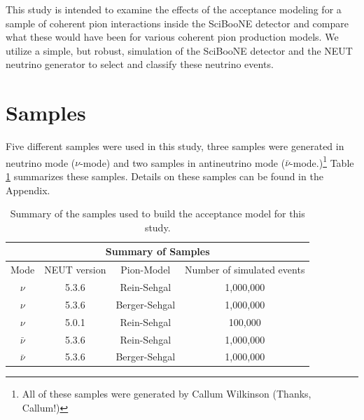 \documentclass[11pt]{article}
\begin{document}
This study is intended to examine the effects of the acceptance modeling for a sample of coherent pion interactions inside the SciBooNE detector and compare what these would have been for various coherent pion production models. We utilize a simple, but robust, simulation of the SciBooNE detector and the NEUT neutrino generator to select and classify these neutrino events. 



\section{Samples}
\label{sec:samples}
Five different samples were used in this study, three samples were generated in neutrino mode ($\nu$-mode) and two samples in antineutrino mode ($\bar{\nu}$-mode.)\footnote{All of these samples were generated by Callum Wilkinson (Thanks, Callum!)} Table \ref*{tab:samples} summarizes these samples. Details on these samples can be found in the Appendix.

\begin{center}
\begin{table}[htb]
	\begin{center}
	\begin{tabular}{c|c|c|c}
	\multicolumn{4}{c}{\textbf{Summary of Samples}} \\
	\hline \hline
	 Mode & NEUT version & Pion-Model & Number of simulated events\\
	\hline
	 $\nu$ & 5.3.6 & Rein-Sehgal & 1,000,000 \\
	\hline
	$\nu$ & 5.3.6 & Berger-Sehgal & 1,000,000 \\
	\hline
	$\nu$ & 5.0.1 & Rein-Sehgal & 100,000 \\
	\hline
	 $\bar{\nu}$ & 5.3.6 & Rein-Sehgal & 1,000,000 \\
	\hline
	$\bar{\nu}$ & 5.3.6 & Berger-Sehgal & 1,000,000 \\
	\hline
	\end{tabular}%
	\caption{Summary of the samples used to build the acceptance model for this study.}
	\label{tab:samples}
	\end{center}
\end{table}
\end{center}



\end{document}
